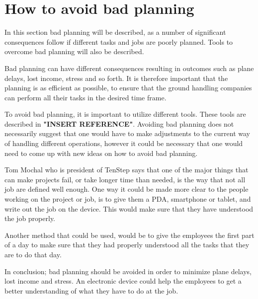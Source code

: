 \section{How to avoid bad planning}
In this section bad planning will be described, as a number of significant consequences follow if different tasks and jobs are poorly planned. Tools to overcome bad planning will also be described.

Bad planning can have different consequences resulting in outcomes such as plane delays, lost income, stress and so forth. It is therefore important that the planning is as efficient as possible, to ensure that the ground handling companies can perform all their tasks in the desired time frame.

To avoid bad planning, it is important to utilize different tools. These tools are described in \textbf{"INSERT REFERENCE"}. Avoiding bad planning does not necessarily suggest that one would have to make adjustments to the current way of handling different operations, however it could be necessary that one would need to come up with new ideas on how to avoid bad planning.

Tom Mochal who is president of TenStep \cite{AvoidP_TenStep} says that one of the major things that can make projects fail, or take longer time than needed, is the way that not all job are defined well enough. One way it could be made more clear to the people working on the project or job, is to give them a PDA, smartphone or tablet, and write out the job on the device. This would make sure that they have understood the job properly.


Another method that could be used, would be to give the employees the first part of a day to make sure that they had properly understood all the tasks that they are to do that day.

In conclusion; bad planning should be avoided in order to minimize plane delays, lost income and stress. An electronic device could help the employees to get a better understanding of what they have to do at the job. 